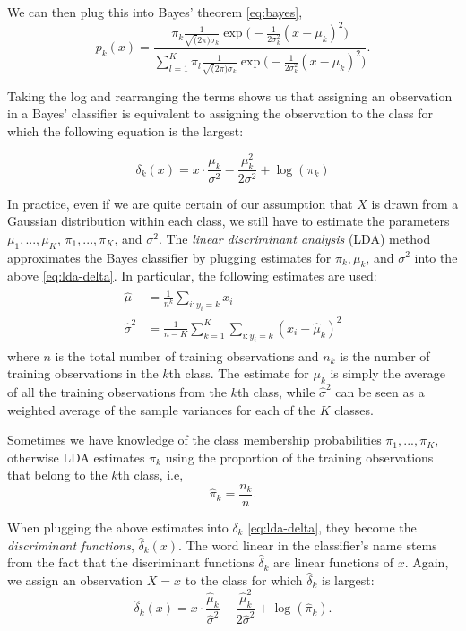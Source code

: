 \documentclass{article}
\numberwithin{equation}{section}
\begin{document}
\begin{enumerate}
We can then plug this into Bayes' theorem \eqref{eq:bayes},
\begin{equation}
    p_k(x) = \frac{
        \pi_k \frac{1}{\sqrt(2\pi) \sigma_k} \exp \Big ( -\frac{1}{2\sigma^2_k} (x-\mu_k)^2 \Big)  
    }{
         \sum_{l=1}^{K} \pi_l \frac{1}{\sqrt(2\pi) \sigma_k} \exp \Big ( -\frac{1}{2\sigma^2_k} (x-\mu_k)^2 \Big) 
    }.  
\end{equation}

Taking the log and rearranging the terms shows us that assigning an observation in a Bayes' classifier is equivalent to assigning the observation to the class for which the following equation is the largest:

\begin{equation}\label{eq:lda-delta}
    \delta_k(x) = x \cdot \frac{\mu_k}{\sigma^2} -\frac{\mu_k^2}{2\sigma^2} + \log(\pi_k)
\end{equation}

In practice, even if we are quite certain of our assumption that $X$ is drawn from a Gaussian distribution within each class, we still have to estimate the parameters $\mu_1,...,\mu_K$, $\pi_1,..., \pi_K$, and $\sigma^2$. The \textit{linear discriminant analysis} (LDA) method approximates the Bayes classifier by plugging estimates for $\pi_k, \mu_k$, and $\sigma^2$ into the above \eqref{eq:lda-delta}.  In particular, the following estimates are used:
\begin{align}
\begin{split}
    \hat \mu &=  \frac{1}{n^k} \sum_{i:y_i = k} x_i \\
    \hat \sigma^2 &= \frac{1}{n-K} \sum_{k=1}^K \sum_{i:y_i = k} (x_i - \hat \mu_k)^2 
\end{split}
\end{align}
where $n$ is the total number of training observations and $n_k$ is the number
of training observations in the $k$th class. The estimate for $\mu_k$ is simply the average of all the training observations from the $k$th class, while $\hat\sigma^2$ can be seen as a weighted average of the sample variances for each of the $K$ classes.

Sometimes we have knowledge of the class membership probabilities $\pi_1,...,\pi_K$, otherwise LDA estimates $\pi_k$ using the proportion of the training observations that belong to the $k$th class, i.e,
\begin{equation}
    \hat \pi_k = \frac{n_k}{n}.
\end{equation}

When plugging the above estimates into $\delta_k$ \eqref{eq:lda-delta}, they become the \textit{discriminant functions}, $\hat \delta_k(x)$. The word linear in the classifier’s name stems from the fact that the discriminant functions $\hat \delta_k$ are linear functions of $x$. Again, we assign an observation $X = x$ to the class for which $\hat \delta_k$ is largest:
\begin{equation}
    \hat \delta_k(x) = x \cdot \frac{\hat \mu_k}{\hat \sigma^2} -\frac{\hat \mu_k^2}{2 \hat \sigma^2} + \log(\hat \pi_k).
\end{equation}


\end{enumerate}
\end{document}
